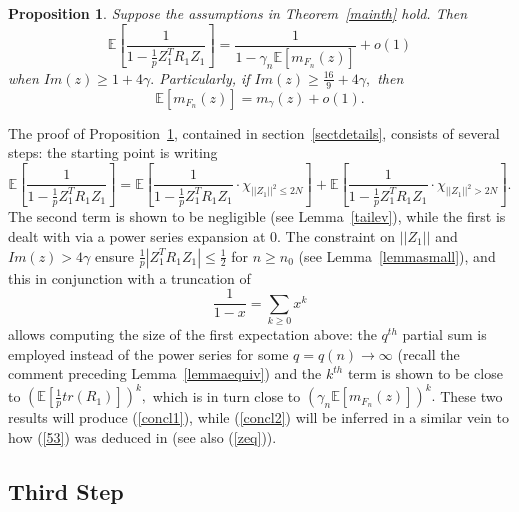 \documentclass{article}
\newtheorem{proposition}{Proposition}
\numberwithin{equation}{section}
\begin{document}
\begin{proposition}\label{propstep2}
     Suppose the assumptions in Theorem~\ref{mainth} hold. %
     Then %
     \begin{equation}\tag{\(s2.0\)}\label{concl1}
         \mathbb{E}[\frac{1}{1-\frac{1}{p}Z_1^TR_1Z_1}]=\frac{1}{1-\gamma_n\mathbb{E}[m_{F_n}(z)]}+o(1)
     \end{equation}
     when \(Im(z) \geq 1+4\gamma.\) Particularly, if \(Im(z) \geq \frac{16}{9}+4\gamma,\) then
     \begin{equation}\tag{\(s2\)}\label{concl2}
         \mathbb{E}[m_{F_n}(z)]=m_{\gamma}(z)+o(1).
     \end{equation}
\end{proposition}

The proof of Proposition~\ref{propstep2}, contained in section~\ref{sectdetails}, consists of several steps: the starting point is writing
\[\mathbb{E}[\frac{1}{1-\frac{1}{p}Z_1^TR_1Z_1}]=\mathbb{E}[\frac{1}{1-\frac{1}{p}Z_1^TR_1Z_1}\cdot \chi_{||Z_1||^2 \leq 2N}]+\mathbb{E}[\frac{1}{1-\frac{1}{p}Z_1^TR_1Z_1}\cdot \chi_{||Z_1||^2>2N}].\]
The second term is shown to be negligible (see Lemma~\ref{tailev}), while the first is dealt with via a power series expansion at \(0.\) The constraint on \(||Z_1||\) and \(Im(z)>4\gamma\) ensure \(\frac{1}{p}|Z_1^TR_1Z_1| \leq \frac{1}{2}\) for \(n \geq n_0\) (see Lemma~\ref{lemmasmall}), and this in conjunction with a truncation of
\[\frac{1}{1-x}=\sum_{k \geq 0}{x^k}\]
allows computing the size of the first expectation above: the \(q^{th}\) partial sum is employed instead of the power series for some \(q=q(n)\to \infty\) (recall the comment preceding Lemma~\ref{lemmaequiv}) and the \(k^{th}\) term is shown to be close to \((\mathbb{E}[\frac{1}{p}tr(R_1)])^k,\) which is in turn close to \((\gamma_n\mathbb{E}[m_{F_n}(z)])^k.\) These two results will produce (\ref{concl1}), while (\ref{concl2}) will be inferred in a similar vein to how (\ref{53}) was deduced in \cite{oldpaper} (see also (\ref{zeq})). 

\subsection*{Third Step}
\end{document}
